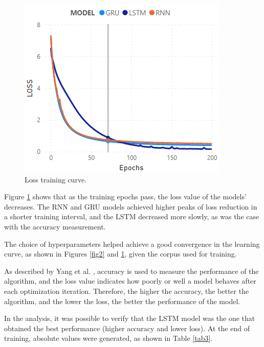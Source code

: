 \documentclass[conference]{IEEEtran}
\begin{document}
\begin{figure}[htbp]
\centerline{\includegraphics[scale=0.75]{images/loss.PNG}}
\caption{Loss training curve.}
\label{fig3}
\end{figure}

Figure \ref{fig3} shows that as the training epochs pass, the loss value of the models' decreases. The RNN and GRU models achieved higher peaks of loss reduction in a shorter training interval, and the LSTM decreased more slowly, as was the case with the accuracy measurement.

The choice of hyperparameters helped achieve a good convergence in the learning curve, as shown in Figures \ref{fig2} and \ref{fig3}, given the corpus used for training.

As described by Yang et al. \cite{b20}, accuracy is used to measure the performance of the algorithm, and the loss value indicates how poorly or well a model behaves after each optimization iteration. Therefore, the higher the accuracy, the better the algorithm, and the lower the loss, the better the performance of the model.

In the analysis, it was possible to verify that the LSTM model was the one that obtained the best performance (higher accuracy and lower loss). At the end of training, absolute values were generated, as shown in Table \ref{tab3}.
\end{document}
